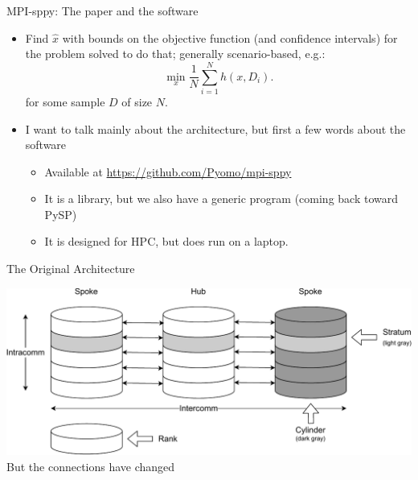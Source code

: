 \documentclass[9pt,usenames,dvipsnames]{beamer}
\begin{document}
\begin{frame}{MPI-sppy: The paper and the software}
\begin{itemize}
\item Find $\hat{x}$ with bounds on the objective function (and confidence intervals) for the problem solved to do that; generally scenario-based, e.g.:
  $$
   \min_x \frac{1}{N} \sum_{i=1}^N h(x, D_i).
   $$
   for some sample $D$ of size $N$.
\item I want to talk mainly about the architecture, but first a few words about the software 
  \begin{itemize}
  \item Available at \url{https://github.com/Pyomo/mpi-sppy}
  \item It is a library, but we also have a generic program (coming back toward PySP)
    \item It is designed for HPC, but does run on a laptop.
    \end{itemize}
\end{itemize}
\end{frame}

\begin{frame}{The Original Architecture}
  \subtitle{MPI: Message Passing Interface}

\includegraphics[width=1.0\linewidth]{hubspoke.pdf}
But the connections have changed
\end{frame}
\end{document}
